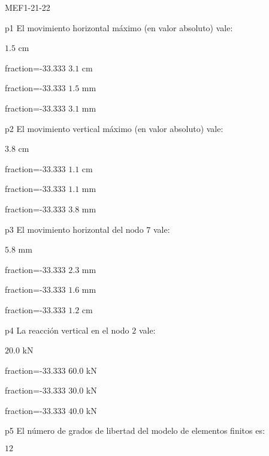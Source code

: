 \documentclass[a4paper]{article}
\begin{document}
	
\begin{quiz}{MEF1-21-22}

\begin{multi}{p1}
El movimiento horizontal m\'aximo (en valor absoluto) vale:
	\item* $1.5$ cm
	\item[fraction=-33.333]  $3.1$ cm
	\item[fraction=-33.333]  $1.5$ mm
	\item[fraction=-33.333]  $3.1$ mm
\end{multi}
\begin{multi}{p2}
El movimiento vertical m\'aximo (en valor absoluto) vale:
	\item* $3.8$ cm
	\item[fraction=-33.333] $1.1$ cm
	\item[fraction=-33.333] $1.1$ mm
	\item[fraction=-33.333] $3.8$ mm
\end{multi}
\begin{multi}{p3}
El movimiento horizontal del nodo $7$ vale:
	\item* $5.8$ mm
	\item[fraction=-33.333] $2.3$ mm
	\item[fraction=-33.333] $1.6$ mm
	\item[fraction=-33.333] $1.2$ cm
\end{multi}
\begin{multi}{p4}
La reacci\'on vertical en el nodo $2$ vale:
	\item* $20.0$ kN
	\item[fraction=-33.333] $60.0$ kN
	\item[fraction=-33.333] $30.0$ kN
	\item[fraction=-33.333] $40.0$ kN
\end{multi}
\begin{multi}{p5}
El n\'umero de grados de libertad del modelo de elementos finitos es:
	\item* $12$

\end{multi}
\end{quiz}
\end{document}
